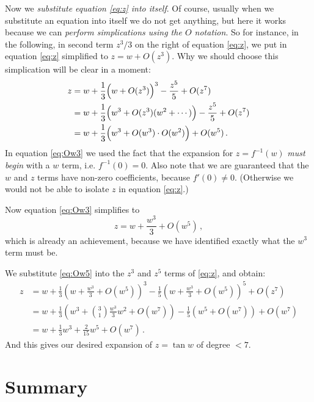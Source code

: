 \documentclass[12pt]{article}
\begin{document}
Now we \emph{substitute equation \eqref{eq:z} into itself}.
Of course, usually when we substitute an equation into itself
we do not get anything, but here it works because we can 
\emph{perform simplications using the $O$ notation}.
So for instance, in the following,
in second term $z^3/3$ on the right of equation \eqref{eq:z}, we put in
equation \eqref{eq:z} simplified to $z = w + O(z^3)$.
Why we should choose this simplication will be clear in a moment:
\begin{align}
\label{eq:z3}
z &= w + \frac{1}{3} \Bigl( w + O(z^3) \Bigr)^3 - \frac{z^5}{5} + O(z^7) \\
&= w + \frac{1}{3} \Bigl( w^3 + O(z^3) (w^2 + \dotsb) \Bigr) - \frac{z^5}{5} + O(z^7) \\
\label{eq:Ow3}
&= w + \frac{1}{3} \Bigl( w^3 + O(w^3) \cdot O(w^2) \Bigr) + O(w^5)\,.
\end{align}
In equation \eqref{eq:Ow3} we used the fact that the expansion
for $z = f^{-1}(w)$ \emph{must begin} with a $w$ term, i.e.
$f^{-1}(0) = 0$.  Also note that we are guaranteed that the $w$ and $z$ terms
have non-zero coefficients, because $f'(0) \neq 0$.  (Otherwise
we would not be able to isolate $z$ in equation \eqref{eq:z}.)

Now equation \eqref{eq:Ow3} simplifies to
\begin{equation}
\label{eq:Ow5}
z = w + \frac{w^3}{3} + O(w^5)\,,
\end{equation}
which is already an achievement, because we have identified
exactly what the $w^3$ term must be.

We substitute \eqref{eq:Ow5} into the $z^3$ and $z^5$ terms of \eqref{eq:z},
and obtain:
\begin{align}
z &= w + \frac{1}{3} \left( w + \frac{w^3}{3} + O(w^5) \right)^3 - \frac{1}{5} \left( w + \frac{w^3}{3} + O(w^5) \right)^5 + O(z^7) \\
&= w + \frac{1}{3} \left( w^3 + \binom{3}{1} \frac{w^3}{3} w^2 + O(w^7) \right) - \frac{1}{5} \left( w^5 + O(w^7) \right) + O(w^7)  \\
&= w + \frac{1}{3} w^3 + \frac{2}{15} w^5 + O(w^7)\,.
\end{align}
And this gives our desired expansion of $z = \tan w$ 
of degree $<7$.

\section*{Summary}
\end{document}
